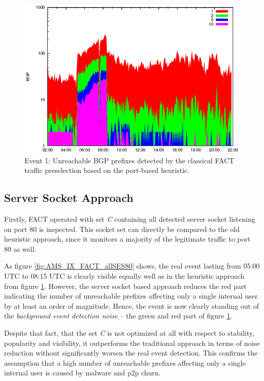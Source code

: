 \begin{figure}
	[p] \centering 
	\includegraphics[width=0.75\linewidth]{images/events/2010_03_25/bgp_log_port80_ref.eps}
	\caption{Event 1: Unreachable BGP prefixes detected by the classical FACT traffic preselection based on the port-based heuristic.} 
	\label{fig:AMS_IX_FACT_REF} 
\end{figure}

\subsection{Server Socket Approach}

Firstly, FACT operated with set \emph{C} containing all detected server socket 
listening on port 80 is inspected. This socket set can directly be compared to 
the old heuristic approach, since it monitors a majority of the legitimate 
traffic to port 80 as well. 

As figure \ref{fig:AMS_IX_FACT_allSES80} shows, the real event lasting from 
05.00 UTC to 08:15 UTC is clearly visible equally well as in the heuristic 
approach from figure \ref{fig:AMS_IX_FACT_REF}. However, the server socket based 
approach reduces the red part indicating the number of unreachable prefixes 
affecting only a single internal user by at least an order of magnitude. Hence,  
the event is now clearly standing out of the \emph{background event detection 
noise} -- the green and red part of figure \ref{fig:AMS_IX_FACT_REF}. 

Despite that fact, that the set \emph{C} is not optimized at all with respect to 
stability, popularity and visibility, it outperforms the traditional approach 
in terms of noise reduction without significantly worsen the real event 
detection. This confirms the assumption that a high number of unreachable 
prefixes affecting only a single internal user is caused by malware and p2p 
churn.

